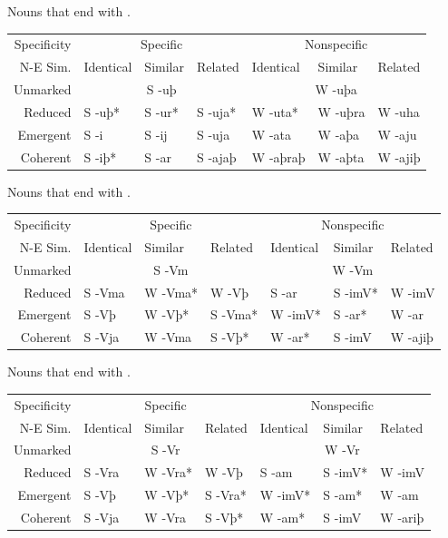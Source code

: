 \documentclass{book}
\begin{document}
\begin{tablenf}
  \caption{Nouns that end with .}
  \centering
  \begin{tabular}{r|lll|lll}
    Specificity & \multicolumn{3}{c|}{Specific} & \multicolumn{3}{c}{Nonspecific} \\
    N-E \bs{} Sim. & Identical & Similar & Related & Identical & Similar & Related \\
    \hline
    Unmarked & \multicolumn{3}{c|}{S -uþ} & \multicolumn{3}{c}{W -uþa} \\
    Reduced & S -uþ* & S -ur* & S -uja* & W -uta* & W -uþra & W -uha \\
    Emergent & S -i & S -ij & S -uja & W -ata & W -aþa & W -aju \\
    Coherent & S -iþ* & S -ar & S -ajaþ & W -aþraþ & W -aþta & W -ajiþ \\
  \end{tabular}
\end{tablenf}

\begin{tablenf}
  \caption{Nouns that end with . \label{table:declensionlast}}
  \centering
  \begin{tabular}{r|lll|lll}
    Specificity & \multicolumn{3}{c|}{Specific} & \multicolumn{3}{c}{Nonspecific} \\
    N-E \bs{} Sim. & Identical & Similar & Related & Identical & Similar & Related \\
    \hline
    Unmarked & \multicolumn{3}{c|}{S -Vm} & \multicolumn{3}{c}{W -Vm} \\
    Reduced & S -Vma & W -Vma* & W -Vþ & S -ar & S -imV* & W -imV \\
    Emergent & S -Vþ & W -Vþ* & S -Vma* & W -imV* & S -ar* & W -ar \\
    Coherent & S -Vja & W -Vma & S -Vþ* & W -ar* & S -imV & W -ajiþ \\
  \end{tabular}
\end{tablenf}

\begin{tablenf}
  \caption{Nouns that end with . \label{table:declensionlast}}
  \centering
  \begin{tabular}{r|lll|lll}
    Specificity & \multicolumn{3}{c|}{Specific} & \multicolumn{3}{c}{Nonspecific} \\
    N-E \bs{} Sim. & Identical & Similar & Related & Identical & Similar & Related \\
    \hline
    Unmarked & \multicolumn{3}{c|}{S -Vr} & \multicolumn{3}{c}{W -Vr} \\
    Reduced & S -Vra & W -Vra* & W -Vþ & S -am & S -imV* & W -imV \\
    Emergent & S -Vþ & W -Vþ* & S -Vra* & W -imV* & S -am* & W -am \\
    Coherent & S -Vja & W -Vra & S -Vþ* & W -am* & S -imV & W -ariþ \\
  \end{tabular}
\end{tablenf}
\end{document}
